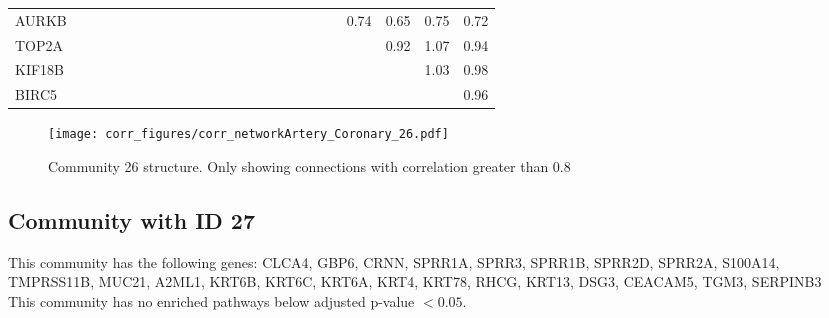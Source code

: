 \begin{longtable}{lrrrrrrrrrrrrrrrrrrrrrrr}
AURKB  &              &            &             &            &             &              &             &            &            &             &             &             &             &             &              &             &             &              &             &        0.74 &         0.65 &        0.75 &        0.72 \\
TOP2A  &              &            &             &            &             &              &             &            &            &             &             &             &             &             &              &             &             &              &             &             &         0.92 &        1.07 &        0.94 \\
KIF18B &              &            &             &            &             &              &             &            &            &             &             &             &             &             &              &             &             &              &             &             &              &        1.03 &        0.98 \\
BIRC5  &              &            &             &            &             &              &             &            &            &             &             &             &             &             &              &             &             &              &             &             &              &             &        0.96 \\
\end{longtable}


\begin{figure}[h!]
\centering
\texttt{[image: corr\_figures/corr\_networkArtery\_Coronary\_26.pdf]}
\caption{Community 26 structure. Only showing connections with correlation greater than 0.8}
\end{figure}




\subsection*{Community with ID 27}
This community has the following genes: CLCA4, GBP6, CRNN, SPRR1A, SPRR3, SPRR1B, SPRR2D, SPRR2A, S100A14, TMPRSS11B, MUC21, A2ML1, KRT6B, KRT6C, KRT6A, KRT4, KRT78, RHCG, KRT13, DSG3, CEACAM5, TGM3, SERPINB3
\\
This community has no enriched pathways below adjusted p-value $< 0.05$.

